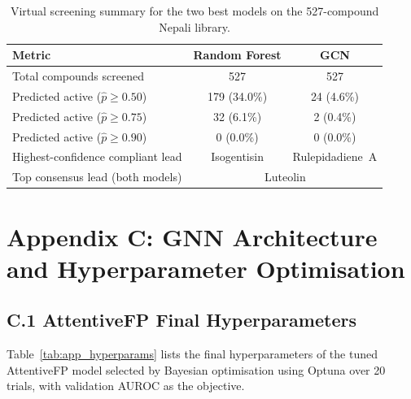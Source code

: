 \begin{table}[H]
\caption{Virtual screening summary for the two best models on the 527-compound Nepali library.}
\label{tab:app_vs_summary}
\centering
\begin{tabular}{@{}lcc@{}}
\toprule
\textbf{Metric} & \textbf{Random Forest} & \textbf{GCN} \\
\midrule
Total compounds screened          & 527 & 527 \\
Predicted active ($\hat{p} \geq 0.50$) & 179 (34.0\%) & 24 (4.6\%) \\
Predicted active ($\hat{p} \geq 0.75$) & 32 (6.1\%)   &  2 (0.4\%) \\
Predicted active ($\hat{p} \geq 0.90$) &  0 (0.0\%)   &  0 (0.0\%) \\
Highest-confidence compliant lead & Isogentisin & Rulepidadiene~A \\
Top consensus lead (both models)  & \multicolumn{2}{c}{Luteolin} \\
\bottomrule
\end{tabular}
\end{table}


\clearpage
\section*{Appendix C: GNN Architecture and
          Hyperparameter Optimisation}
\label{app:hyperparams}

\subsection*{C.1 AttentiveFP Final Hyperparameters}

Table~\ref{tab:app_hyperparams} lists the final
hyperparameters of the tuned AttentiveFP model selected
by Bayesian optimisation using Optuna over 20 trials,
with validation AUROC as the objective.


